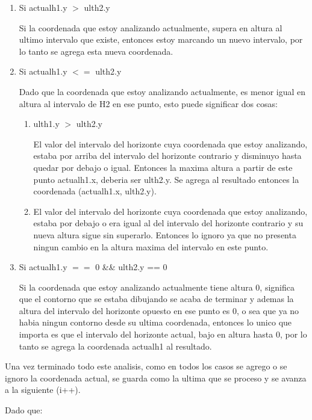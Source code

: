 \documentclass[10pt,a4paper]{article}
\begin{document}
\begin{enumerate}
\begin{enumerate}
\item Si actualh1.y $>$ ulth2.y

Si la coordenada que estoy analizando actualmente, supera en altura al ultimo intervalo que existe, entonces estoy marcando un nuevo intervalo, por lo tanto se agrega esta nueva coordenada.
\item Si actualh1.y $<=$ ulth2.y

Dado que la coordenada que estoy analizando actualmente, es menor igual en altura al intervalo de H2 en ese punto, esto puede significar dos cosas: 
\begin{enumerate}
\item ulth1.y $>$ ulth2.y

El valor del intervalo del horizonte cuya coordenada que estoy analizando, estaba por arriba del intervalo del horizonte contrario y disminuyo hasta quedar por debajo o igual. Entonces la maxima altura a partir de este punto actualh1.x, deberia ser ulth2.y. Se agrega al resultado entonces la coordenada (actualh1.x, ulth2.y).
\item El valor del intervalo del horizonte cuya coordenada que estoy analizando, estaba por debajo o era igual al del intervalo del horizonte contrario y su nueva altura sigue sin superarlo. Entonces lo ignoro ya que no presenta ningun cambio en la altura maxima del intervalo en este punto.
\end{enumerate}


\item Si actualh1.y $==$ 0 \&\& ulth2.y == 0

Si la coordenada que estoy analizando actualmente tiene altura 0, significa que el contorno que se estaba dibujando se acaba de terminar y ademas la altura del intervalo del horizonte opuesto en ese punto es 0, o sea que ya no habia ningun contorno desde su ultima coordenada, entonces lo unico que importa es que el intervalo del horizonte actual, bajo en altura hasta 0, por lo tanto se agrega la coordenada actualh1 al resultado.
\end{enumerate}

Una vez terminado todo este analisis, como en todos los casos se agrego o se ignoro la coordenada actual, se guarda como la ultima que se proceso y se avanza a la siguiente (i++).

Dado que:


\end{enumerate}
\end{document}
